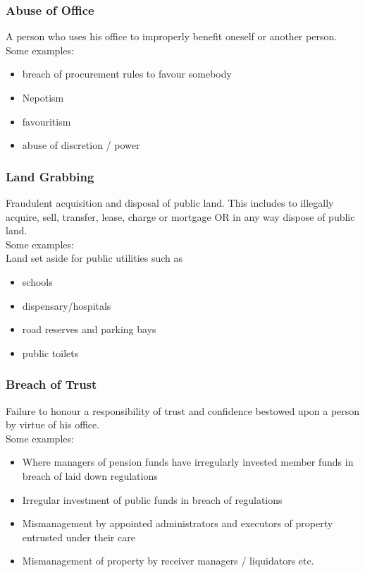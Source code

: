 \subsubsection{Abuse of Office}
A person who uses his office to improperly benefit oneself or another person.\\
Some examples:\\
\begin{itemize}
	\item breach of procurement rules to favour somebody
	\item Nepotism
	\item favouritism
	\item abuse of discretion / power
	
\end{itemize}

\subsubsection{Land Grabbing}
Fraudulent acquisition and disposal of public land. This includes to illegally acquire, sell, transfer, lease, charge or mortgage OR in any way dispose of public land.\\
Some examples:\\
Land set aside for public utilities such as\\


\begin{itemize}
	\item schools
	\item dispensary/hospitals
	\item road reserves and parking bays
	\item public toilets
\end{itemize}



\subsubsection{Breach of Trust}
Failure to honour a responsibility of trust and confidence bestowed upon a person by virtue of his office.\\
Some examples:\\
\begin{itemize}
	\item Where managers of pension funds have irregularly invested member funds in breach of laid down regulations
	\item Irregular investment of public funds in breach of regulations
	\item Mismanagement by appointed administrators and executors of property entrusted under their care
	\item Mismanagement of property by receiver managers / liquidators etc.

\end{itemize}



